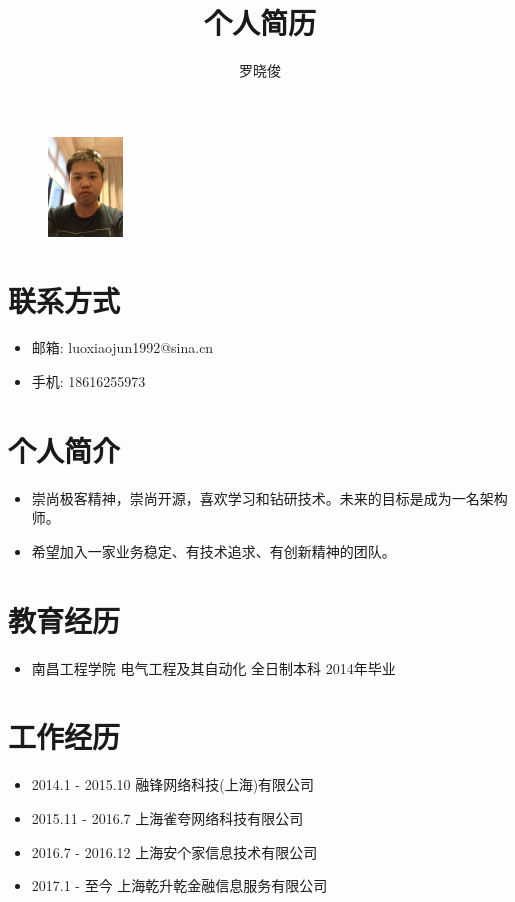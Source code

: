 \documentclass[a4paper,12pt]{article}
\title{个人简历}
\author{罗晓俊}
\begin{document}
	\begin{CJK}{UTF8}{gbsn}

		\maketitle{}

		\begin{figure}[h]
			\centering\includegraphics[height=100px]{webwxgetmsgimg.jpeg}
		\end{figure}

		\section{联系方式}
			\begin{itemize}
				\item{邮箱: luoxiaojun1992@sina.cn}
				\item{手机: 18616255973}
			\end{itemize}

		\section{个人简介}
			\begin{itemize}
				\item{崇尚极客精神，崇尚开源，喜欢学习和钻研技术。未来的目标是成为一名架构师。}
				\item{希望加入一家业务稳定、有技术追求、有创新精神的团队。}
			\end{itemize}
		
		\section{教育经历}
			\begin{itemize}
				\item{南昌工程学院 电气工程及其自动化 全日制本科 2014年毕业}
			\end{itemize}
		
		\section{工作经历}
			\begin{itemize}
				\item{2014.1 - 2015.10 融锋网络科技(上海)有限公司}
				\item{2015.11 - 2016.7 上海雀夸网络科技有限公司}
				\item{2016.7 - 2016.12 上海安个家信息技术有限公司}
				\item{2017.1 - 至今 上海乾升乾金融信息服务有限公司}
			\end{itemize}
		

\end{CJK}
\end{document}
